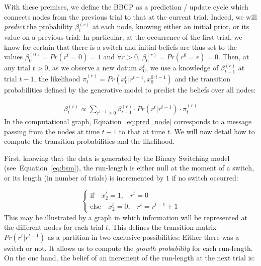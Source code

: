 \documentclass[10pt,letterpaper]{article}
\newcommand{\choice}[1]{ %
	\left\{ %
		\begin{array}{l} #1 \end{array} %
	\right. }
\newcommand{\eql}[1]{\begin{equation}#1\end{equation}}
\newcommand{\eqa}[1]{\begin{align}#1\end{align}}
\newcommand{\Ll}{\mathcal{L}}
\newcommand{\seeFig}[1]{Figure~\ref{fig:#1}}
\newcommand{\seeEq}[1]{Equation~\ref{eq:#1}}
\begin{document}
With these premises, we define the BBCP
as a prediction / update cycle
which connects nodes from the previous trial to that at the current trial.
Indeed, we will \emph{predict} the probability
$\beta^{(r)}_t$ at each node, knowing either an initial prior, or its value on a previous trial.
In particular, at the occurrence of the first trial, we know for certain that there is a switch and
initial beliefs are thus set to the values $\beta^{(0)}_0=Pr(r^t=0)=1$ and
$\forall r>0$, $\beta^{(r)}_0=Pr(r^0=r)=0$.
Then, at any trial $t>0$, as we observe a new datum $x_0^t$,
we use a knowledge of $\beta^{(r)}_{t-1}$ at trial $t-1$,
the likelihood $\pi^{(r)}_{t}=Pr(x_0^{t} | r^{t-1}, x_0^{0:t-1})$  and
the transition probabilities defined by the generative model
to predict the beliefs over all nodes: %

\eqa{
\beta^{(r)}_t \propto \sum_{r^{t-1} \geq 0} \beta^{(r)}_{t-1} \cdot Pr(r^t | r^{t-1}) \cdot  \pi^{(r)}_{t}
\label{eq:pred_node}
}
In the computational graph, %
\seeEq{pred_node} corresponds to a message passing from the nodes at time $t-1$
to that at time $t$. %
We will now detail how to compute the transition probabilities and the likelihood.

First, knowing that the data is generated by the Binary Switching model (see~\seeEq{bsm}),
the run-length is either null at the moment of a switch,
or its length (in number of trials) is incremented by $1$ if no switch occurred:

\eql{\choice{
\text{if} \quad x_2^t=1 \text{,} \quad r^t = 0\\
\text{else} \quad x_2^t=0 \text{,} \quad r^t = r^{t-1} +1 }\label{eq:run_length}}%
This may be illustrated by a graph
in which information will be represented at the different nodes for each trial $t$.
This defines the transition matrix $Pr(r^t | r^{t-1})$
as a partition in two exclusive possibilities:
Either there was a switch or not.
It allows us to compute the \emph{growth probability} for each run-length. %
On the one hand, the belief of an increment of the run-length at the next trial is: %
\end{document}
